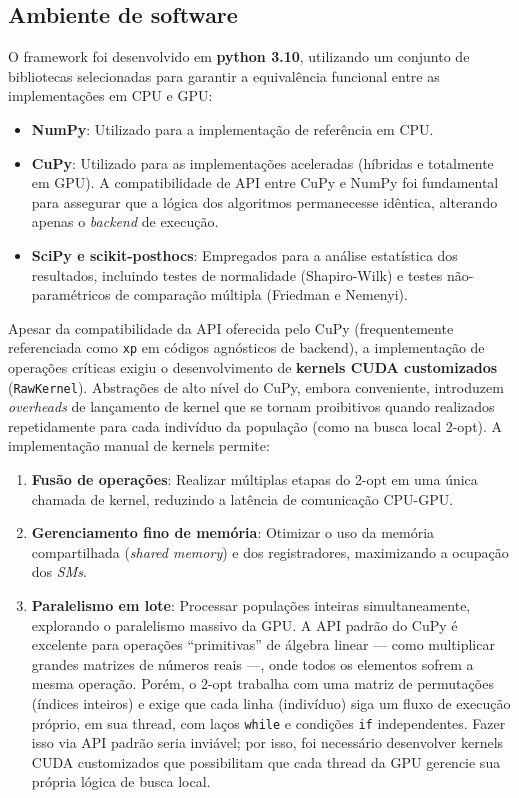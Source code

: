 \subsection{Ambiente de software}\label{sec-312-ambiente-software}

O framework foi desenvolvido em \textbf{python 3.10}, utilizando um conjunto de bibliotecas selecionadas para garantir a equivalência funcional entre as implementações em CPU e GPU:

\begin{itemize}
  \tightlist
  \item
        \textbf{NumPy}: Utilizado para a implementação de referência em CPU.
  \item
        \textbf{CuPy}: Utilizado para as implementações aceleradas (híbridas e totalmente em GPU). A compatibilidade de API entre CuPy e NumPy foi fundamental para assegurar que a lógica dos algoritmos permanecesse idêntica, alterando apenas o \emph{backend} de execução.
  \item
        \textbf{SciPy e scikit-posthocs}: Empregados para a análise estatística dos resultados, incluindo testes de normalidade (Shapiro-Wilk) e testes não-paramétricos de comparação múltipla (Friedman e Nemenyi).
\end{itemize}

Apesar da compatibilidade da API oferecida pelo CuPy (frequentemente referenciada como \texttt{xp} em códigos agnósticos de backend), a implementação de operações críticas exigiu o desenvolvimento de \textbf{kernels CUDA customizados} (\texttt{RawKernel}). Abstrações de alto nível do CuPy, embora conveniente, introduzem \emph{overheads} de lançamento de kernel que se tornam proibitivos quando realizados repetidamente para cada indivíduo da população (como na busca local 2-opt). A implementação manual de kernels permite:

\begin{enumerate}
  \def\labelenumi{\arabic{enumi}.}
  \tightlist
  \item
        \textbf{Fusão de operações}: Realizar múltiplas etapas do 2-opt em uma única chamada de kernel, reduzindo a latência de comunicação CPU-GPU.
  \item
        \textbf{Gerenciamento fino de memória}: Otimizar o uso da memória compartilhada (\emph{shared memory}) e dos registradores, maximizando a ocupação dos \emph{SMs}.
  \item
        \textbf{Paralelismo em lote}: Processar populações inteiras simultaneamente, explorando o paralelismo massivo da GPU. A API padrão do CuPy é excelente para operações ``primitivas'' de álgebra linear — como multiplicar grandes matrizes de números reais —, onde todos os elementos sofrem a mesma operação. Porém, o \(2\)-opt trabalha com uma matriz de permutações (índices inteiros) e exige que cada linha (indivíduo) siga um fluxo de execução próprio, em sua thread, com laços \texttt{while} e condições \texttt{if} independentes. Fazer isso via API padrão seria inviável; por isso, foi necessário desenvolver kernels CUDA customizados que possibilitam que cada thread da GPU gerencie sua própria lógica de busca local.
\end{enumerate}


